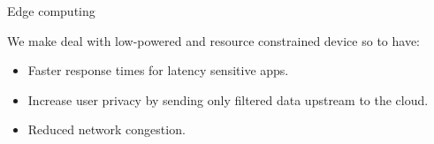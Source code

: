 \begin{frame}{Edge computing}

We make deal with low-powered and resource constrained device so to have:

\begin{itemize}
\item<1-> Faster response times for latency sensitive apps.
\item<2-> Increase user privacy by sending only filtered data upstream to the cloud.
\item<3-> Reduced network congestion.
\end{itemize}
    
\end{frame}